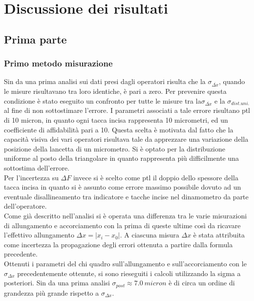 \documentclass[a4paper,11pt,oneside]{article}
\begin{document}

\newpage

\section{Discussione dei risultati}

\subsection{Prima parte}
\subsubsection*{Primo metodo misurazione}
Sin da una prima analisi sui dati presi dagli operatori risulta che la $\sigma_{\overline{\Delta x}}$, quando le misure risultavano tra loro identiche, è pari a zero. Per prevenire questa condizione è stato eseguito un confronto per tutte le misure tra la$\sigma_{\overline{\Delta x}}$ e la $\sigma_{dist. uni.}$ al fine di non sottostimare l'errore. I parametri associati a tale errore risultano ptl di 10 micron, in quanto ogni tacca incisa rappresenta 10 micrometri, ed un coefficiente di affidabilità pari a 10. Questa scelta è motivata dal fatto che la capacità visiva dei vari operatori risultava tale da apprezzare una variazione della posizione della lancetta di un micrometro. Si è optato per la distribuzione uniforme al posto della triangolare in quanto rappresenta più difficilmente una sottostima dell'errore.\\
Per l'incertezza su $\Delta F$ invece si è scelto come ptl il doppio dello spessore della tacca incisa in quanto si è assunto come errore massimo possibile dovuto ad un eventuale disallineamento tra indicatore e tacche incise nel dinamometro da parte dell'operatore.\\



Come già descritto nell'analisi si è operata una differenza tra le varie misurazioni di allungamento e accorciamento con la prima di queste ultime così da ricavare l'effettivo allungamento $\Delta x=| x_{i}-x_{0}|$. A ciascuna misura $\Delta x$ è stata attribuita come incertezza la propagazione degli errori ottenuta a partire dalla formula precedente.\\

Ottenuti i parametri del chi quadro sull'allungamento e sull'accorciamento con le $\sigma_{\Delta x}$ precedentemente ottenute, si sono rieseguiti i calcoli utilizzando la sigma a posteriori. Sin da una prima analisi $\sigma_{post} \approx \SI{7.0}{micron}$ è di circa un ordine di grandezza più grande rispetto a $\sigma_{\Delta x}$.
\end{document}
